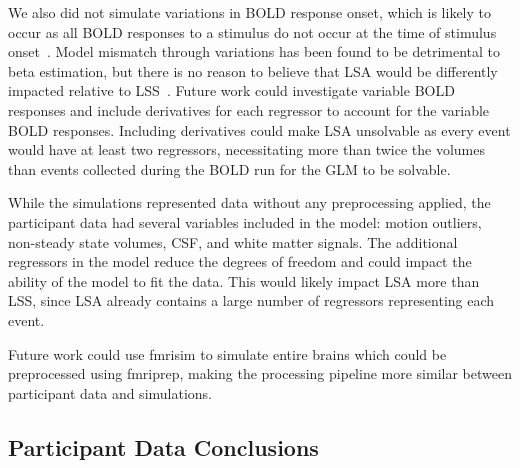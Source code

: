 \documentclass[phd,appendix,figures]{uithesis}
\begin{document}
We also did not simulate variations in BOLD response onset, which is likely to occur
as all BOLD responses to a stimulus do not occur at the time of stimulus onset~\cite{DEsposito2003}.
Model mismatch through variations has been found to be detrimental to beta estimation, 
but there is no reason to believe that LSA would be differently impacted relative to LSS~\cite{Turner2012a}.
Future work could investigate variable BOLD responses and include derivatives for each regressor to account for
the variable BOLD responses.
Including derivatives could make LSA unsolvable as every event would have at least two regressors, necessitating
more than twice the volumes than events collected during the BOLD run
for the GLM to be solvable.

While the simulations represented data without any preprocessing applied,
the participant data had several variables included in the model: motion outliers, non-steady state volumes,
CSF, and white matter signals.
The additional regressors in the model reduce the degrees of freedom
and could impact the ability of the model to fit the data.
This would likely impact LSA more than LSS, since LSA already contains
a large number of regressors representing each event.

Future work could use fmrisim to simulate entire brains which could be preprocessed using fmriprep,
making the processing pipeline more similar between participant data and simulations.

\subsection*{Participant Data Conclusions}
\label{discussion:taskswitching-conclusions}
\end{document}

